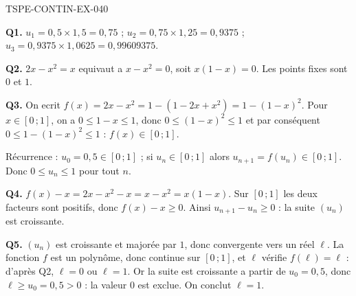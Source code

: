 \begin{corrige}{TSPE-CONTIN-EX-040}

\textbf{Q1.} $u_1 = 0{,}5 \times 1{,}5 = 0{,}75$ ; $u_2 = 0{,}75 \times 1{,}25 = 0{,}9375$ ; $u_3 = 0{,}9375 \times 1{,}0625 = 0{,}99609375$.

\textbf{Q2.} $2x - x^2 = x$ equivaut a $x - x^2 = 0$, soit $x(1-x) = 0$. Les points fixes sont $0$ et $1$.

\textbf{Q3.} On ecrit $f(x) = 2x - x^2 = 1 - (1 - 2x + x^2) = 1 - (1-x)^2$. Pour $x \in [0\,;1]$, on a $0 \leq 1-x \leq 1$, donc $0 \leq (1-x)^2 \leq 1$ et par conséquent $0 \leq 1 - (1-x)^2 \leq 1$ : $f(x) \in [0\,;1]$.

Récurrence : $u_0 = 0{,}5 \in [0\,;1]$ ; si $u_n \in [0\,;1]$ alors $u_{n+1} = f(u_n) \in [0\,;1]$. Donc $0 \leq u_n \leq 1$ pour tout $n$.

\textbf{Q4.} $f(x) - x = 2x - x^2 - x = x - x^2 = x(1-x)$. Sur $[0\,;1]$ les deux facteurs sont positifs, donc $f(x) - x \geq 0$. Ainsi $u_{n+1} - u_n \geq 0$ : la suite $(u_n)$ est croissante.

\textbf{Q5.} $(u_n)$ est croissante et majorée par $1$, donc convergente vers un réel $\ell$. La fonction $f$ est un polynôme, donc continue sur $[0\,;1]$, et $\ell$ vérifie $f(\ell) = \ell$ : d'après Q2, $\ell = 0$ ou $\ell = 1$. Or la suite est croissante a partir de $u_0 = 0{,}5$, donc $\ell \geq u_0 = 0{,}5 > 0$ : la valeur $0$ est exclue. On conclut $\ell = 1$.
\end{corrige}
